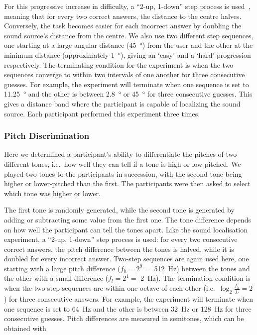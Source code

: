 \documentclass[acmsmall]{acmart}
\begin{document}
For this progressive increase in difficulty, a ``2-up, 1-down'' step process is used~\citep{wetherill1965sequential,levitt1971transformed}, meaning that for every two correct answers, the distance to the centre halves.
Conversely, the task becomes easier for each incorrect answer by doubling the sound source's distance from the centre.
We also use two different step sequences, one starting at a large angular distance (\SI{45}{\degree}) from the user and the other at the minimum distance (approximately \SI{1}{\degree}), giving an `easy' and a `hard' progression respectively.
The terminating condition for the experiment is when the two sequences converge to within two intervals of one another for three consecutive guesses.
For example, the experiment will terminate when one sequence is set to \SI{11.25}{\degree} and the other is between \SI{2.8}{\degree} or \SI{45}{\degree} for three consecutive guesses.
This gives a distance band where the participant is capable of localizing the sound source.
Each participant performed this experiment three times. 

\subsubsection{Pitch Discrimination}\label{sec:pitch_discrimination}

Here we determined a participant's ability to differentiate the pitches of two different tones, i.e.\ how well they can tell if a tone is high or low pitched.
We played two tones to the participants in succession, with the second tone being higher or lower-pitched than the first.
The participants were then asked to select which tone was higher or lower.

The first tone is randomly generated, while the second tone is generated by adding or subtracting some value from the first one.
The tone difference depends on how well the participant can tell the tones apart.
Like the sound localisation experiment, a ``2-up, 1-down'' step process is used: for every two consecutive correct answers, the pitch difference between the tones is halved, while it is doubled for every incorrect answer.
Two-step sequences are again used here, one starting with a large pitch difference ($f_h=2^9=$ \SI{512}{\hertz}) between the tones and the other with a small difference ($f_l=2^1=$ \SI{2}{\hertz}).
The termination condition is when the two-step sequences are within one octave of each other (i.e.\ $\log_2\frac{f_h}{f_l}=2$) for three consecutive answers.
For example, the experiment will terminate when one sequence is set to \SI{64}{\hertz} and the other is between \SI{32}{\hertz} or \SI{128}{\hertz} for three consecutive guesses.
Pitch differences are measured in semitones, which can be obtained with
\end{document}

